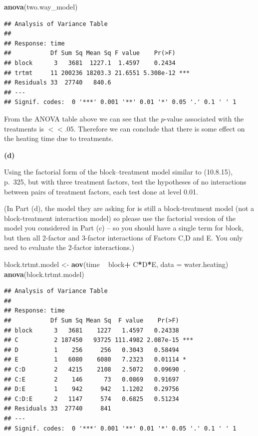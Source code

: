 \documentclass[12pt,]{article}
\newenvironment{Shaded}{\begin{snugshade}}{\end{snugshade}}
\newcommand{\KeywordTok}[1]{\textcolor[rgb]{0.13,0.29,0.53}{\textbf{#1}}}
\newcommand{\DataTypeTok}[1]{\textcolor[rgb]{0.13,0.29,0.53}{#1}}
\newcommand{\StringTok}[1]{\textcolor[rgb]{0.31,0.60,0.02}{#1}}
\newcommand{\OperatorTok}[1]{\textcolor[rgb]{0.81,0.36,0.00}{\textbf{#1}}}
\newcommand{\NormalTok}[1]{#1}
\begin{document}
\begin{Shaded}
\begin{Highlighting}[]
\KeywordTok{anova}\NormalTok{(two.way_model)}
\end{Highlighting}
\end{Shaded}

\begin{verbatim}
## Analysis of Variance Table
## 
## Response: time
##           Df Sum Sq Mean Sq F value    Pr(>F)    
## block      3   3681  1227.1  1.4597    0.2434    
## trtmt     11 200236 18203.3 21.6551 5.308e-12 ***
## Residuals 33  27740   840.6                      
## ---
## Signif. codes:  0 '***' 0.001 '**' 0.01 '*' 0.05 '.' 0.1 ' ' 1
\end{verbatim}

From the ANOVA table above we can see that the \(p\)-value associated
with the treatments is \(<< .05\). Therefore we can conclude that there
is some effect on the heating time due to treatments.

\textbf{(d)}

Using the factorial form of the block--treatment model similar to
(10.8.15), p.~325, but with three treatment factors, test the hypotheses
of no interactions between pairs of treatment factors, each test done at
level 0.01.

(In Part (d), the model they are asking for is still a block-treatment
model (not a block-treatment interaction model) so please use the
factorial version of the model you considered in Part (c) -- so you
should have a single term for block, but then all 2-factor and 3-factor
interactions of Factors C,D and E. You only need to evaluate the
2-factor interactions.)

\begin{Shaded}
\begin{Highlighting}[]
\NormalTok{block.trtmt.model <-}\StringTok{ }\KeywordTok{aov}\NormalTok{(time }\OperatorTok{~}\StringTok{ }\NormalTok{block}\OperatorTok{+}\StringTok{ }\NormalTok{C}\OperatorTok{*}\NormalTok{D}\OperatorTok{*}\NormalTok{E, }\DataTypeTok{data =}\NormalTok{ water.heating)}
\KeywordTok{anova}\NormalTok{(block.trtmt.model)}
\end{Highlighting}
\end{Shaded}

\begin{verbatim}
## Analysis of Variance Table
## 
## Response: time
##           Df Sum Sq Mean Sq  F value    Pr(>F)    
## block      3   3681    1227   1.4597   0.24338    
## C          2 187450   93725 111.4982 2.087e-15 ***
## D          1    256     256   0.3043   0.58494    
## E          1   6080    6080   7.2323   0.01114 *  
## C:D        2   4215    2108   2.5072   0.09690 .  
## C:E        2    146      73   0.0869   0.91697    
## D:E        1    942     942   1.1202   0.29756    
## C:D:E      2   1147     574   0.6825   0.51234    
## Residuals 33  27740     841                       
## ---
## Signif. codes:  0 '***' 0.001 '**' 0.01 '*' 0.05 '.' 0.1 ' ' 1
\end{verbatim}
\end{document}
